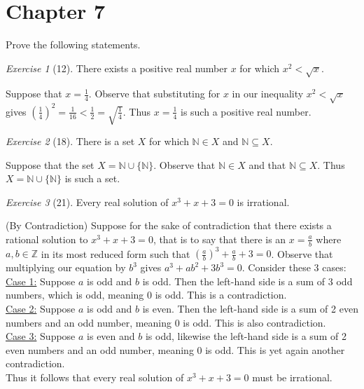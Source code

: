 \documentclass[12pt]{amsart}
\makeatletter
\theoremstyle{remark}
\newtheorem*{exercise}{Exercise}%
\def\NN{\ensuremath{\mathbb N}}
\def\ZZ{\ensuremath{\mathbb Z}}
\renewenvironment{proof}[1][\proofname]{\par\doublespacing
  \pushQED{\qed}%
  \normalfont \topsep6\p@\@plus6\p@\relax
  \list{}{%
    \settowidth{\leftmargin}{\itshape\proofname:\hskip\labelsep}%
    \setlength{\labelwidth}{0pt}%
    \setlength{\itemindent}{-\leftmargin}%
  }%
  \item[\hskip\labelsep\itshape#1\@addpunct{:}]\ignorespaces
}{%
  \popQED\endlist\@endpefalse
  \singlespacing
}
\theoremstyle{mycomment}
\makeatother
\begin{document}
\thispagestyle{fancy}

\section*{Chapter 7} Prove the following statements.
\begin{exercise}[12] There exists a positive real number $x$ for which $x^{2}<\sqrt{x}$.
\begin{proof}
  Suppose that $x = \frac{1}{4}$. Observe that substituting for $x$ in our inequality $x^2 < \sqrt{x}$ gives $(\frac{1}{4})^2 = \frac{1}{16} < \frac{1}{2} = \sqrt{\frac{1}{4}}$. Thus $x = \frac{1}{4}$ is such a positive real number.
\end{proof}
\end{exercise}

\begin{exercise}[18] There is a set $X$ for which $\NN\in X$ and $\NN\subseteq X$.
\begin{proof}
  Suppose that the set $X = \NN \cup \{\NN\}$. Observe that $\NN \in X$ and that $\NN \subseteq X$. Thus $X = \NN \cup \{\NN\}$ is such a set.
\end{proof}
\end{exercise}

\begin{exercise}[21] Every real solution of $x^{3}+x+3=0$ is irrational.
\begin{proof}
  (By Contradiction) Suppose for the sake of contradiction that there exists a rational solution to $x^{3} + x +3 = 0$, that is to say that there is an $x = \frac{a}{b}$ where $a,b \in \ZZ$ in its most reduced form such that $(\frac{a}{b})^3 + \frac{a}{b} + 3 = 0$. Observe that multiplying our equation by $b^3$ gives $a^3 + ab^2 + 3b^3 = 0$. Consider these 3 cases:\\ 
  \underline{Case 1:} Suppose $a$ is odd and $b$ is odd. Then the left-hand side is a sum of 3 odd numbers, which is odd, meaning 0 is odd. This is a contradiction. \\
  \underline{Case 2:} Suppose $a$ is odd and $b$ is even. Then the left-hand side is a sum of 2 even numbers and an odd number, meaning 0 is odd. This is also contradiction. \\
  \underline{Case 3:} Suppose $a$ is even and $b$ is odd, likewise the left-hand side is a sum of 2 even numbers and an odd number, meaning 0 is odd. This is yet again another contradiction. \\
  Thus it follows that every real solution of $x^3 + x + 3 = 0$ must be irrational.
\end{proof}
\end{exercise}
\end{document}
